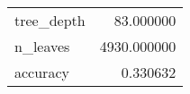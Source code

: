 \begin{tabular}{lr}
\toprule
 &  \\
\midrule
tree\_depth & 83.000000 \\
n\_leaves & 4930.000000 \\
accuracy & 0.330632 \\
\bottomrule
\end{tabular}